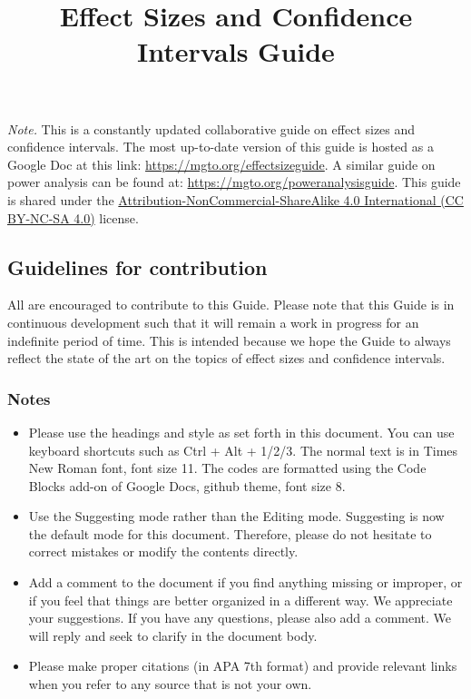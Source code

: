 \documentclass[
  man,
  colorlinks=true,linkcolor=blue,citecolor=blue,urlcolor=blue]{apa7}
\title{Effect Sizes and Confidence Intervals Guide}
\date{}
\begin{document}
\maketitle
\ifdefined\Shaded\renewenvironment{Shaded}{\begin{tcolorbox}[interior hidden, sharp corners, borderline west={3pt}{0pt}{shadecolor}, boxrule=0pt, enhanced, frame hidden, breakable]}{\end{tcolorbox}}\fi
\emph{Note.} This is a constantly updated collaborative guide on effect
sizes and confidence intervals. The most up-to-date version of this
guide is hosted as a Google Doc at this link:
\url{https://mgto.org/effectsizeguide}. A similar guide on power
analysis can be found at: \url{https://mgto.org/poweranalysisguide}.
This guide is shared under the
\href{https://creativecommons.org/licenses/by-nc-sa/4.0/}{Attribution-NonCommercial-ShareAlike
4.0 International (CC BY-NC-SA 4.0)} license.

\hypertarget{guidelines-for-contribution}{%
\subsection{Guidelines for
contribution}\label{guidelines-for-contribution}}

All are encouraged to contribute to this Guide. Please note that this
Guide is in continuous development such that it will remain a work in
progress for an indefinite period of time. This is intended because we
hope the Guide to always reflect the state of the art on the topics of
effect sizes and confidence intervals.

\hypertarget{notes}{%
\subsubsection{Notes}\label{notes}}

\begin{itemize}
\item
  Please use the headings and style as set forth in this document. You
  can use keyboard shortcuts such as Ctrl + Alt + 1/2/3. The normal text
  is in Times New Roman font, font size 11. The codes are formatted
  using the Code Blocks add-on of Google Docs, github theme, font size
  8.
\item
  Use the Suggesting mode rather than the Editing mode. Suggesting is
  now the default mode for this document. Therefore, please do not
  hesitate to correct mistakes or modify the contents directly.
\item
  Add a comment to the document if you find anything missing or
  improper, or if you feel that things are better organized in a
  different way. We appreciate your suggestions. If you have any
  questions, please also add a comment. We will reply and seek to
  clarify in the document body.
\item
  Please make proper citations (in APA 7th format) and provide relevant
  links when you refer to any source that is not your own.
\end{itemize}
\end{document}
